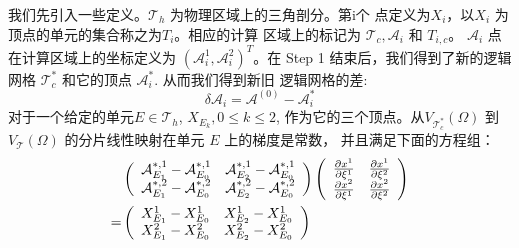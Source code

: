      我们先引入一些定义。$\mathcal{T}_h$ 为物理区域上的三角剖分。第i个
     点定义为$X_i$，以$X_i$ 为顶点的单元的集合称之为$T_i$。相应的计算
     区域上的标记为 $\mathcal{T}_c, \mathcal{A}_i$ 和 $T_{i,c}$。
     $\mathcal{A}_i$ 点在计算区域上的坐标定义为 $(\mathcal{A}_i^1,
     \mathcal{A}_i^2)^T$。在 Step 1 结束后，我们得到了新的逻辑网格
     $\mathcal{T}_c^*$ 和它的顶点 $\mathcal{A}_i^*$. 从而我们得到新旧
     逻辑网格的差:
     \begin{equation}
       \delta \mathcal{A}_i  = \mathcal{A}^{(0)} - \mathcal{A}_i^*
     \end{equation}
     对于一个给定的单元$E \in \mathcal{T}_h$, $X_{E_k}, 0 \leq k \leq
     2 $, 作为它的三个顶点。从$V_{\mathcal{T}_c^*}(\Omega)$ 到
     $V_{\mathcal{T}}(\Omega)$ 的分片线性映射在单元 $E$ 上的梯度是常数，
     并且满足下面的方程组：
     \begin{eqnarray}
       \begin{aligned}
        & \left (
           \begin{array}{cc}
             \mathcal{A}_{E_1}^{*, 1} - \mathcal{A}_{E_0}^{*, 1} &
             \mathcal{A}_{E_2}^{*, 1} - \mathcal{A}_{E_0}^{*, 1} \\
             \mathcal{A}_{E_1}^{*, 2} - \mathcal{A}_{E_0}^{*, 2} &
             \mathcal{A}_{E_2}^{*, 2} - \mathcal{A}_{E_0}^{*, 2}
           \end{array}
         \right )
         \left (
           \begin{array}{cc}
             \frac{\partial x^1}{\partial \xi^1} & \frac{\partial
               x^1}{\partial \xi^2} \\
             \frac{\partial x^2}{\partial
               \xi^1} & \frac{\partial x^2}{\partial \xi^2}
           \end{array}
         \right ) \notag \\ = &
         \left (
           \begin{array}{ll}
             X_{E_1}^1 - X_{E_0}^1 & X_{E_2}^1 - X_{E_0}^1 \\
             X_{E_1}^2 - X_{E_0}^2 & X_{E_2}^2 - X_{E_0}^2
           \end{array}
         \right )
       \end{aligned}
     \end{eqnarray}

